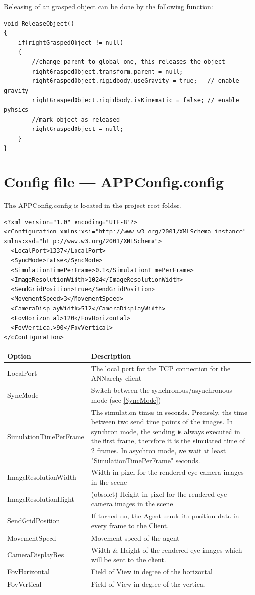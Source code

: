 \documentclass[10pt,final]{scrreprt}
\begin{document}
Releasing of an grasped object can be done by the following function:

\begin{lstlisting}
void ReleaseObject()
{
	if(rightGraspedObject != null)
	{
		//change parent to global one, this releases the object
		rightGraspedObject.transform.parent = null;
		rightGraspedObject.rigidbody.useGravity = true;   // enable gravity
		rightGraspedObject.rigidbody.isKinematic = false; // enable pyhsics
		//mark object as released
		rightGraspedObject = null;
	}
}
\end{lstlisting}

\section{Config file --- APPConfig.config}
\label{appconfig}

The \textsf{APPConfig.config} is located in the project root folder. 

\begin{lstlisting}
<?xml version="1.0" encoding="UTF-8"?>
<cConfiguration xmlns:xsi="http://www.w3.org/2001/XMLSchema-instance" xmlns:xsd="http://www.w3.org/2001/XMLSchema">
  <LocalPort>1337</LocalPort>
  <SyncMode>false</SyncMode>
  <SimulationTimePerFrame>0.1</SimulationTimePerFrame>
  <ImageResolutionWidth>1024</ImageResolutionWidth>
  <SendGridPosition>true</SendGridPosition>
  <MovementSpeed>3</MovementSpeed>
  <CameraDisplayWidth>512</CameraDisplayWidth>
  <FovHorizontal>120</FovHorizontal>
  <FovVertical>90</FovVertical>
</cConfiguration>
\end{lstlisting}


\begin{tabular}{|l|p{10cm}|}
\hline
Option & Description\\\hline\hline
LocalPort & The local port for the TCP connection for the ANNarchy client\\
SyncMode &  Switch between the synchronous/asynchronous mode (see \ref{SyncMode})\\
SimulationTimePerFrame & The simulation times in seconds. Precisely, the time between two send time points of the images. In synchron mode, the sending is always executed in the first frame, therefore it is the simulated time of 2 frames. In asychron mode, we wait at least "SimulationTimePerFrame" seconds.\\
ImageResolutionWidth & Width in pixel for the rendered eye camera images in the scene\\
ImageResolutionHight & (obsolet) Height in pixel for the rendered eye camera images in the scene\\
SendGridPosition & If turned on, the Agent sends its position data in every frame to the Client.\\
MovementSpeed & Movement speed of the agent\\
CameraDisplayRes & Width \& Height of the rendered eye images which will be sent to the client.\\
FovHorizontal & Field of View in degree of the horizontal\\
FovVertical & Field of View in degree of the vertical \\\hline
\end{tabular}
\end{document}

